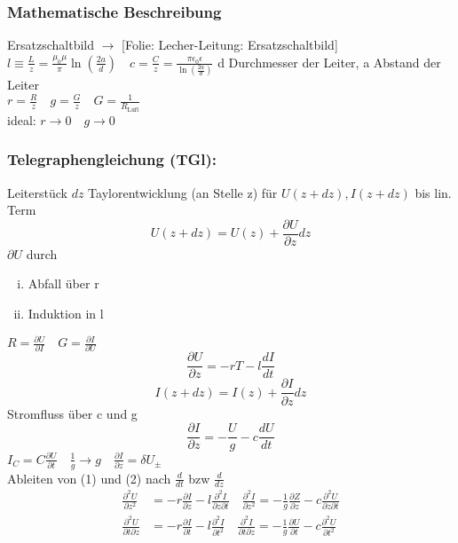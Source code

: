 \documentclass[titlepage,12pt,a4paper,ngerman]{report}
\newcommand{\tx}[1]{\textrm{#1}}
\newcommand{\folie}[1]{\color{gray}[Folie: #1]\color{black}}
\begin{document}
\subsubsection{Mathematische Beschreibung}
Ersatzschaltbild $ \rightarrow $ \folie{Lecher-Leitung: Ersatzschaltbild}\\
$ l \equiv \frac{L}{z} = \frac{\mu_0 \mu}{\pi} \ln(\frac{2a}{d}) \quad c = \frac{C}{z} = \frac{\pi \epsilon_0 \epsilon}{\ln(\frac{2a}{d})} $ d Durchmesser der Leiter, a Abstand der Leiter\\
$ r = \frac{R}{z} \quad g = \frac{G}{z} \quad G = \frac{1}{R_{\tx{Luft}}} $\\
ideal: $ r \rightarrow 0\quad g \rightarrow 0 $
\subsubsection{Telegraphengleichung (TGl):}
Leiterstück $ dz $ Taylorentwicklung (an Stelle z) für $ U(z+dz) , I(z+dz) $ bis lin. Term
$$U(z+dz) = U(z) + \frac{\partial U}{\partial z} dz$$
$ \partial U $ durch 
\begin{enumerate}[i)]
	\item Abfall über r
	\item Induktion in l
\end{enumerate}
$ R = \frac{\partial U}{\partial I} \quad G = \frac{\partial I}{\partial U} $
\begin{equation*}
\boxed{ \frac{\partial U}{\partial z} = - r T - l \frac{dI}{dt} } \tag{1}
\end{equation*}
$$I(z+dz) = I(z) + \frac{\partial I}{\partial z} dz$$
Stromfluss über c und g 
\begin{equation*}
\boxed{ \frac{\partial I}{\partial z} = - \frac{U}{g} - c \frac{dU}{dt}} \tag{2}
\end{equation*}
$ I_C = C \frac{\partial U}{\partial t} \quad \frac{1}{g} \rightarrow g \quad \frac{\partial I}{\partial z} = \delta U _{\pm}$\\
Ableiten von (1) und (2) nach $ \frac{d}{dt} $ bzw $ \frac{d}{dz} $
\begin{align*}
\frac{\partial ^2 U}{\partial z^2} &= - r \frac{\partial I}{\partial z} - l\frac{\partial ^2 I}{\partial z \partial t} \quad \frac{\partial ^2 I}{\partial z^2} = - \frac{1}{g} \frac{\partial Z}{\partial z} - c \frac{\partial ^2 U}{\partial z \partial t}\\
\frac{\partial ^2 U}{\partial t \partial z} &= - r \frac{\partial I}{\partial t} - l \frac{\partial ^2 I }{\partial t^2} \quad \frac{\partial ^2 I}{\partial t \partial z} = - \frac{1}{g} \frac{\partial U}{\partial t} - c \frac{\partial ^2 U}{\partial t^2}
\end{align*}
\end{document}
